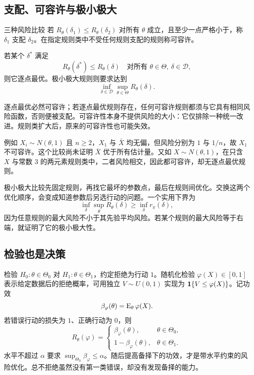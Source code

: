 \subsection{支配、可容许与极小极大}
\begin{definitionbox}{三种风险比较}
若 $R_\theta(\delta_1)\le R_\theta(\delta_2)$ 对所有 $\theta$ 成立，且至少一点严格小于，称 $\delta_1$ 支配 $\delta_2$。在指定规则类中不受任何规则支配的规则称可容许。

若某个 $\delta^*$ 满足
\[
 R_\theta(\delta^*)\le R_\theta(\delta)
 \quad\text{对所有 }\theta\in\Theta,\ \delta\in\mathcal D,
\]
则它逐点最优。极小极大规则则要求达到
\[
 \inf_{\delta\in\mathcal D}\sup_{\theta\in\Theta}R_\theta(\delta).
\]
\end{definitionbox}

逐点最优必然可容许；若逐点最优规则存在，任何可容许规则都须与它具有相同风险函数，否则便被支配。可容许性本身不提供风险的大小：它仅排除一种统一改进。规则类扩大后，原来的可容许性也可能失效。

例如 $X_i\sim N(\theta,1)$ 且 $n\ge2$，$X_1$ 与 $\bar X$ 均无偏，但风险分别为 $1$ 与 $1/n$，故 $X_1$ 不可容许。这个比较尚未证明 $\bar X$ 优于所有估计量。又如 $X\sim N(\theta,1)$，在只含 $X$ 与常数 $3$ 的两元素规则类中，二者风险相交，因此都可容许，却无逐点最优规则。

极小极大比较先固定规则，再找它最坏的参数点，最后在规则间优化。交换这两个优化顺序，会变成知道参数后另选行动的问题。一个实用下界为
\[
 \inf_\delta\sup_\theta R_\theta(\delta)
 \ge \inf_\delta r_\pi(\delta),
\]
因为任意规则的最大风险不小于其先验平均风险。若某个规则的最大风险等于右端，就证明了它的极小极大性。

\subsection{检验也是决策}
检验 $H_0:\theta\in\Theta_0$ 对 $H_1:\theta\in\Theta_1$，约定拒绝为行动 $1$。随机化检验 $\varphi(X)\in[0,1]$ 表示给定数据后的拒绝概率，可用独立 $V\sim U(0,1)$ 实现为 $\mathbf 1\{V\le\varphi(X)\}$。记功效
\[
 \beta_\varphi(\theta)=\operatorname{E}_\theta\varphi(X).
\]
若错误行动的损失为 $1$、正确行动为 $0$，则
\[
 R_\theta(\varphi)=
 \begin{cases}
 \beta_\varphi(\theta),&\theta\in\Theta_0,\\
 1-\beta_\varphi(\theta),&\theta\in\Theta_1.
 \end{cases}
\]
水平不超过 $\alpha$ 要求 $\sup_{\Theta_0}\beta_\varphi\le\alpha$。随后提高备择下的功效，才是带水平约束的风险优化。总不拒绝虽然没有第一类错误，却没有发现备择的能力。

